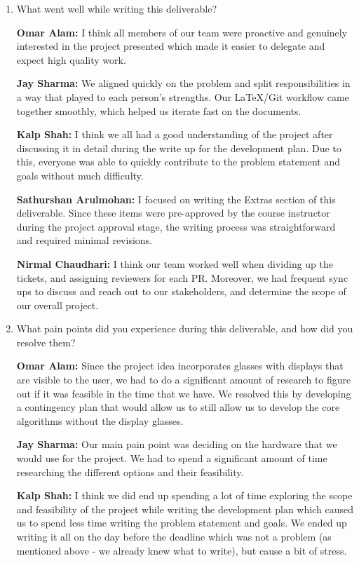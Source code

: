 \documentclass{article}
\begin{document}
\begin{enumerate}
    \item What went well while writing this deliverable? 
    
    \textbf{Omar Alam:} I think all members of our team were proactive and
    genuinely interested in the project presented which made it easier to
    delegate and expect high quality work. 
    
    \textbf{Jay Sharma:} We aligned quickly on the problem and split
    responsibilities in a way that played to each person's strengths. Our
    LaTeX/Git workflow came together smoothly, which helped us iterate fast on
    the documents.

    \textbf{Kalp Shah:} I think we all had a good understanding of the project
    after discussing it in detail during the write up for the development plan.
    Due to this, everyone was able to quickly contribute to the problem
    statement and goals without much difficulty.

    \textbf{Sathurshan Arulmohan:} I focused on writing the Extras section of
    this deliverable. Since these items were pre-approved by the course
    instructor during the project approval stage, the writing process was
    straightforward and required minimal revisions.

    \textbf{Nirmal Chaudhari:} I think our team worked well when dividing up the
    tickets, and assigning reviewers for each PR. Moreover, we had frequent sync
    ups to discuss and reach out to our stakeholders, and determine the scope of
    our overall project. 

    \item What pain points did you experience during this deliverable, and how
    did you resolve them?

    \textbf{Omar Alam:} Since the project idea incorporates glasses with
    displays that are visible to the user, we had to do a significant amount of
    research to figure out if it was feasible in the time that we have. We
    resolved this by developing a contingency plan that would allow us to still
    allow us to develop the core algorithms without the display glasses.

    \textbf{Jay Sharma:} Our main pain point was deciding on the hardware that
     we would use for the project. We had to spend a significant amount of time
     researching the different options and their feasibility.
    
    \textbf{Kalp Shah:} I think we did end up spending a lot of time exploring
    the scope and feasibility of the project while writing the development plan
    which caused us to spend less time writing the problem statement and goals.
    We ended up writing it all on the day before the deadline which was not a
    problem (as mentioned above - we already knew what to write), but cause a
    bit of stress.


\end{enumerate}
\end{document}
